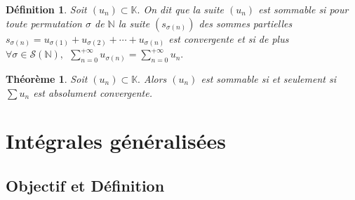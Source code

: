 \documentclass[11pt, a4paper]{book}
\newtheorem{teo}{Th\'eor\`eme}[section]
\newtheorem{defi}{D\'efinition}[section]
\begin{document}
\begin{defi} Soit $(u_n) \subset \mathbb{K}.$ On dit que la suite $(u_n)$ est sommable si pour toute permutation $\sigma$ de $ \mathbb{N}$ la suite $(s_{\sigma(n)})$ des sommes partielles $s_{\sigma(n)}=u_{\sigma(1)}+u_{\sigma(2)}+\cdots+u_{\sigma(n)}$ est convergente et si de plus  ${\displaystyle\forall \sigma \in \mathcal{S}( \mathbb{N}),~~ \sum_{n=0}^{+\infty}u_{\sigma(n)}=\sum_{n=0}^{+\infty}u_n.}$
\end{defi}
\begin{teo} Soit $(u_n) \subset \mathbb{K}.$ Alors $(u_n)$ est sommable si et seulement si $\sum u_n$ est absolument convergente. 
\end{teo} 



\chapter{Int\'egrales g\'en\'eralis\'ees}

\section{Objectif et D\'efinition}
\end{document}
